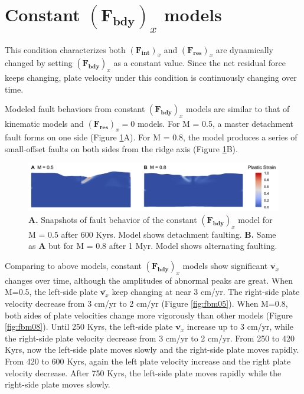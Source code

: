 \documentclass[letterpaper,12pt,notitle]{memphisthesis}                     %
\begin{document}
\section{Constant $(\boldsymbol{F_{bdy}})_x$ models}

This condition characterizes both $(\boldsymbol{F_{int}})_x$ and $(\boldsymbol{F_{res}})_x$ are dynamically changed by setting $(\boldsymbol{F_{bdy}})_x$ as a constant value. Since the net residual force keeps changing, plate velocity under this condition is continuously changing over time.

Modeled fault behaviors from constant $(\boldsymbol{F_{bdy}})_x$ models are similar to that of kinematic models and  $(\boldsymbol{F_{res}})_x = 0$ models. For M = 0.5, a master detachment fault forms on one side (Figure \ref{fig:fbfault}A). For M = 0.8, the model produces a series of small-offset faults on both sides from the ridge axis (Figure \ref{fig:fbfault}B).

\begin{figure}[!htb]
	\centering
	\includegraphics[width=0.99\linewidth]{./figs/fbfault.png}
	\caption{\textbf{A.} Snapshots of fault behavior of the constant $(\boldsymbol{F_{bdy}})_x$ model for M = 0.5 after 600 Kyrs. Model shows detachment faulting. \textbf{B.} Same as \textbf{A} but for M = 0.8 after 1 Myr. Model shows alternating faulting.}
	\label{fig:fbfault}
\end{figure}

Comparing to above models, constant $(\boldsymbol{F_{bdy}})_x$ models show significant $\overline{\boldsymbol{v}_x}$ changes over time, although the amplitudes of abnormal peaks are great. 
When M=0.5, the left-side plate $\overline{\boldsymbol{v}_x}$ keep changing at near 3 cm/yr. The right-side plate velocity decrease from 3 cm/yr to 2 cm/yr (Figure \ref{fig:fbm05}).
When M=0.8, both sides of plate velocities change more vigorously than other models (Figure \ref{fig:fbm08}). Until 250 Kyrs, the left-side plate $\overline{\boldsymbol{v}_x}$ increase up to 3 cm/yr, while the right-side plate velocity decrease from 3 cm/yr to 2 cm/yr. From 250 to 420 Kyrs, now the left-side plate moves slowly and the right-side plate moves rapidly. From 420 to 600 Kyrs, again the left plate velocity increase and the right plate velocity decrease. After 750 Kyrs, the left-side plate moves rapidly while the right-side plate moves slowly.
\end{document}
